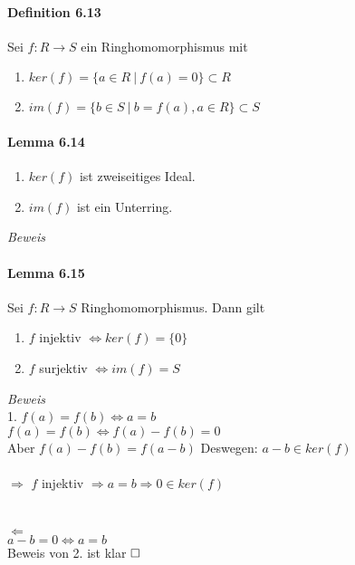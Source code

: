 \documentclass{scrartcl}
\begin{document}
\paragraph{Definition 6.13}
Sei $f: R \to S$ ein Ringhomomorphismus mit
\begin{enumerate}
\item $ker(f) = \{ a \in R ~|~ f(a) = 0\} \subset R$
\item $im(f) = \{ b  \in S ~|~ b = f(a), a \in R \} \subset S$
\end{enumerate}

\paragraph{Lemma 6.14}
\begin{enumerate}
\item $ker(f)$ ist zweiseitiges Ideal.
\item $im(f)$ ist ein Unterring.
\end{enumerate}

\textit{Beweis}

\paragraph{Lemma 6.15}
Sei $f: R \to S$ Ringhomomorphismus. Dann gilt
\begin{enumerate}
\item $f$ injektiv $\Leftrightarrow ker(f) = \{0\}$
\item $f$ surjektiv $\Leftrightarrow im(f) = S$
\end{enumerate}
\textit{Beweis} \\
1.  $f(a) = f(b) \Leftrightarrow a = b$ \\
$f(a) = f(b) \Leftrightarrow f(a) - f(b) = 0$ \\
Aber $f(a) - f(b) = f(a - b)$ Deswegen:
$a - b \in ker(f)$
\\\\
$\Rightarrow$ $f$ injektiv $\Rightarrow a = b \Rightarrow 0 \in ker(f)$
\\\\\\
$\Leftarrow$ \\
$a - b = 0 \Leftrightarrow a = b$\\
Beweis von 2. ist klar
$\hfill \square$
\end{document}
